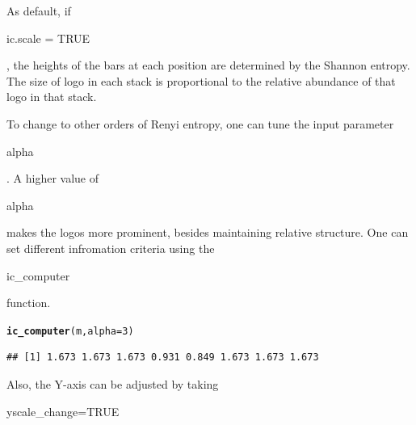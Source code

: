 \documentclass[12pt]{article}\usepackage[]{graphicx}\usepackage[usenames,dvipsnames]{color}
\makeatletter
\newcommand{\hlnum}[1]{\textcolor[rgb]{0.686,0.059,0.569}{#1}}%
\newcommand{\hlstd}[1]{\textcolor[rgb]{0.345,0.345,0.345}{#1}}%
\newcommand{\hlkwc}[1]{\textcolor[rgb]{0.333,0.667,0.333}{#1}}%
\newcommand{\hlkwd}[1]{\textcolor[rgb]{0.737,0.353,0.396}{\textbf{#1}}}%
\newenvironment{kframe}{%
 \def\at@end@of@kframe{}%
 \ifinner\ifhmode%
  \def\at@end@of@kframe{\end{minipage}}%
  \begin{minipage}{\columnwidth}%
 \fi\fi%
 \def\FrameCommand##1{\hskip\@totalleftmargin \hskip-\fboxsep
 \colorbox{shadecolor}{##1}\hskip-\fboxsep
     \hskip-\linewidth \hskip-\@totalleftmargin \hskip\columnwidth}%
 \MakeFramed {\advance\hsize-\width
   \@totalleftmargin\z@ \linewidth\hsize
   \@setminipage}}%
 {\par\unskip\endMakeFramed%
 \at@end@of@kframe}
\newenvironment{knitrout}{}{} %
\makeatother
\begin{document}
\newpage

As default, if \begin{verb} ic.scale = TRUE \end{verb}, the heights of the bars at each position are determined by the Shannon entropy. The size of logo in each stack is proportional to the relative abundance of that logo in that stack.

To change to other orders of Renyi entropy, one can tune the input parameter \begin{verb} alpha \end{verb}. A higher value of  \begin{verb} alpha \end{verb} makes the logos more prominent, besides maintaining relative structure. One can set different infromation criteria using the \begin{verb} ic_computer \end{verb}
function.

\begin{knitrout}
\color{fgcolor}\begin{kframe}
\begin{alltt}
\hlkwd{ic_computer}\hlstd{(m,} \hlkwc{alpha}\hlstd{=}\hlnum{3}\hlstd{)}
\end{alltt}
\begin{verbatim}
## [1] 1.673 1.673 1.673 0.931 0.849 1.673 1.673 1.673
\end{verbatim}
\end{kframe}
\end{knitrout}

Also, the Y-axis can be adjusted by taking \begin{verb} yscale_change=TRUE \end{verb}
\end{document}
